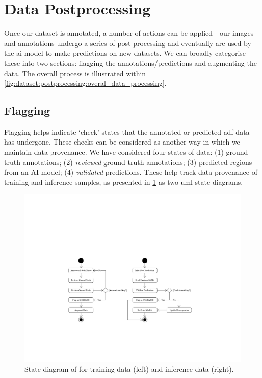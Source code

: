 \section{Data Postprocessing}
\label{sec:dataset:postprocessing}

Once our dataset is annotated, a number of actions can be applied---our images and annotations undergo a series of post-processing and eventually are used by the \gls{ai} model to make predictions on new datasets. We can broadly categorise these into two sections: flagging the annotations/predictions and augmenting the data. The overall process is illustrated within \cref{fig:dataset:postprocessing:overal_data_processing}.

\subsection{Flagging}
\label{sec:dataset:postprocessing:flagging}

Flagging helps indicate `check'-states that the annotated or predicted \gls{adf} data has undergone. These checks can be considered as another way in which we maintain data provenance. We have considered four states of data: (1) ground truth annotations; (2) \textit{reviewed} ground truth annotations; (3) predicted regions from an AI model; (4) \textit{validated} predictions. These help track data provenance of training and inference samples, as presented in \cref{fig:dataset:postprocessing:state_diagram_flagging} as two \gls{uml} state diagrams.

\begin{figure}[h]
  \centering
  \includegraphics[width=\textwidth]{images/dataset/flagging_statemodel}
  \caption[State diagram to represent flagging]{State diagram of for training data (left) and inference data (right).}
  \label{fig:dataset:postprocessing:state_diagram_flagging}
\end{figure}

